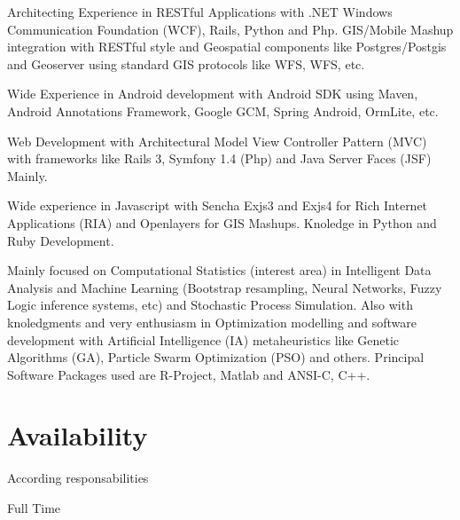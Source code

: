 \documentclass[11pt,letterpaper,roman]{moderncv}
\begin{document}
		{Architecting Experience in RESTful Applications with .NET Windows
		Communication Foundation (WCF), Rails, Python and Php. GIS/Mobile Mashup
		integration with RESTful style and Geospatial components like Postgres/Postgis
		and Geoserver using standard GIS protocols like WFS, WFS, etc.}

		{Wide Experience in Android development with Android
		SDK using Maven, Android Annotations Framework, Google GCM, Spring Android, OrmLite, etc.}

		{Web Development with Architectural Model View
		Controller Pattern (MVC) with frameworks like Rails 3, Symfony 1.4 (Php) and
		Java Server Faces (JSF) Mainly.}

		{Wide experience in Javascript with Sencha
		Exjs3 and Exjs4 for Rich Internet Applications (RIA) and Openlayers for GIS
		Mashups. Knoledge in Python and Ruby Development.}

		{Mainly focused on Computational Statistics (interest area) in
		Intelligent Data Analysis and Machine Learning (Bootstrap resampling, Neural
		Networks, Fuzzy Logic inference systems, etc)  and Stochastic Process
		Simulation. Also with knoledgments and very enthusiasm in Optimization modelling
		and software development with Artificial Intelligence (IA) metaheuristics like
		Genetic Algorithms (GA), Particle Swarm Optimization (PSO) and others. Principal
		Software Packages used are R-Project, Matlab and ANSI-C, C++.}

\section{Availability}
	{According responsabilities}

	{Full Time}
\end{document}
